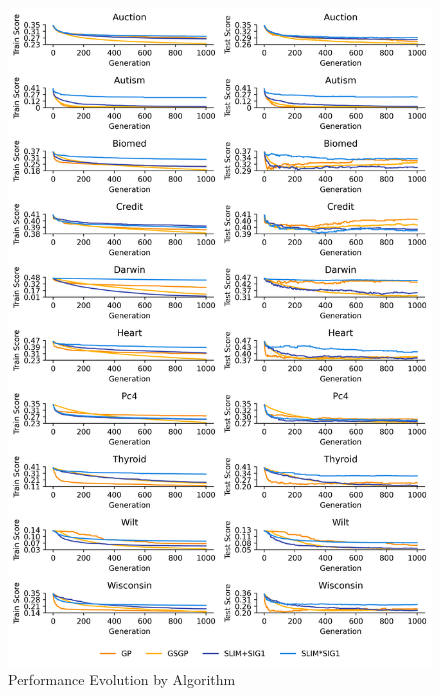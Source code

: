 
    \begin{figure}[H]
    \centering
    \includegraphics[width=\linewidth]{../Latex/Chapters/Figures/Results/RQ_Comparison_performance_evolution.png}
    \caption{Performance Evolution by Algorithm}
    \label{fig:RQ_Comparison_performance_evolution}
    \end{figure}
    